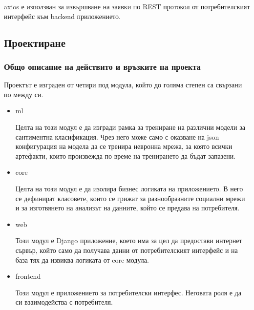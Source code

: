 \documentclass{article}
\begin{document}
    axios \cite{axios} е използван за извършване на заявки по REST протокол от потребителският интерфейс към backend
    приложението.

    \subsection{Проектиране}

    \subsubsection{Общо описание на действито и връзките на проекта}

    Проектът е изграден от четири под модула, който до голяма степен са свързани по между си.

    \begin{itemize}

        \item ml

        Целта на този модул е да изгради рамка за трениране на различни модели за сантиментна класификация. Чрез него може
        само с оказване на json конфигурация на модела да се тренира невронна мрежа, за която всички артефакти, които
        произвежда по време на тренирането да бъдат запазени.

        \item core

        Целта на този модул е да изолира бизнес логиката на приложението. В него се дефинират класовете, които се грижат за
        разнообразните социални мрежи и за изготвянето на анализът на данните, който се предава на потребителя.

        \item web

        Този модул е Django приложение, което има за цел да предостави интернет сървър, който само да получава данни от
        потребителският интерфейс и на база тях да извиква логиката от core модула.

        \item frontend

        Този модул е приложението за потребителски интерфес. Неговата роля е да си взаимодейства с потребителя.

    \end{itemize}
\end{document}
